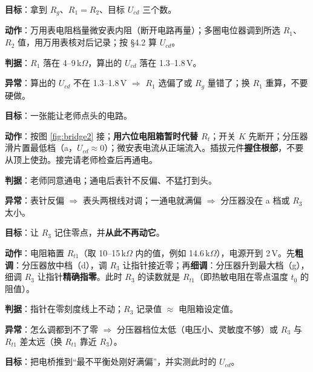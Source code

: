 \documentclass[11pt]{ctexart}
\begin{document}

\textbf{目标}：拿到 $R_g$、$R_1=R_2$、目标 $U_{cd}$ 三个数。

\textbf{动作}：万用表电阻档量微安表内阻（断开电路再量）；多圈电位器调到所选 $R_1$、$R_2$ 值，用万用表核对后记录；按 §4.2 算 $U_{cd}$。

\textbf{判据}：$R_1$ 落在 4--9\,k$\Omega$，算出的 $U_{cd}$ 落在 1.3--1.8\,V。

\textbf{异常}：算出的 $U_{cd}$ 不在 1.3--1.8\,V $\Rightarrow$ $R_1$ 选偏了或 $R_g$ 量错了；换 $R_1$ 重算，不要硬做。


\textbf{目标}：一张能让老师点头的电路。

\textbf{动作}：按图 \ref{fig:bridge2} 接；\textbf{用六位电阻箱暂时代替 $R_t$}；开关 $K$ 先断开；分压器滑片置最低档（a，$U_{cd}\approx0$）；微安表电流从正端流入。插拔元件\textbf{握住根部}，不要从顶上使劲。接完请老师检查后再通电。

\textbf{判据}：老师同意通电；通电后表针不反偏、不猛打到头。

\textbf{异常}：表针反偏 $\Rightarrow$ 表头两根线对调；一通电就满偏 $\Rightarrow$ 分压器没在 a 档或 $R_3$ 太小。


\textbf{目标}：让 $R_3$ 记住零点，并\textbf{从此不再动它}。

\textbf{动作}：电阻箱置 $R_{t1}$（取 10--15\,k$\Omega$ 内的值，例如 14.6\,k$\Omega$），电源开到 2\,V。先\textbf{粗调}：分压器放中档（d），调 $R_3$ 让指针接近零；再\textbf{细调}：分压器升到最大档（g），细调 $R_3$ 让指针\textbf{精确指零}。此时 $R_3$ 的读数就是 $R_{t1}$（即热敏电阻在零点温度 $t_0$ 的阻值）。

\textbf{判据}：指针在零刻度线上不动；$R_3$ 记录值 $\approx$ 电阻箱设定值。

\textbf{异常}：怎么调都到不了零 $\Rightarrow$ 分压器档位太低（电压小、灵敏度不够）或 $R_3$ 与 $R_{t1}$ 差太远（换 $R_{t1}$ 靠近 $R_3$）。



\textbf{目标}：把电桥推到“最不平衡处刚好满偏”，并实测此时的 $U_{cd}$。
\end{document}
